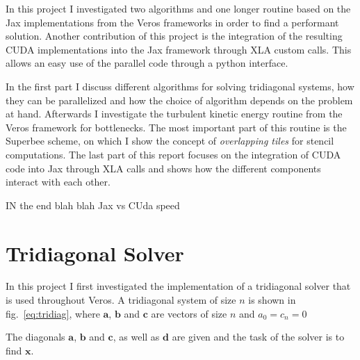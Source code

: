 \documentclass[a4paper,oneside]{memoir}
\begin{document}
In this project I investigated two algorithms and one longer routine based on the Jax implementations from the Veros frameworks in order to find a performant solution.
Another contribution of this project is the integration of the resulting CUDA implementations into the Jax framework through XLA custom calls. This allows an easy use of the parallel code through a python interface.

In the first part I discuss different algorithms for solving tridiagonal systems, how they can be parallelized and how the choice of algorithm depends on the problem at hand. Afterwards I investigate the turbulent kinetic energy routine from the Veros framework for bottlenecks. The most important part of this routine is the Superbee scheme, on which I show the concept of \emph{overlapping tiles} for stencil computations.
The last part of this report focuses on the integration of CUDA code into Jax through XLA calls and shows how the different components interact with each other.


IN the end blah blah Jax vs CUda speed


\section{Tridiagonal Solver}
In this project I first investigated the implementation of a tridiagonal solver that is used throughout Veros. 
A tridiagonal system of size $n$ is shown in fig.~\ref{eq:tridiag}, where $\bm{a}$, $\bm{b}$ and $\bm{c}$ are vectors of size $n$ and $a_0 = c_n = 0$ 

The diagonals $\bm{a}$, $\bm{b}$ and $\bm{c}$, as well as $\bm{d}$ are given and the task of the solver is to find $\bm{x}$.
\end{document}
